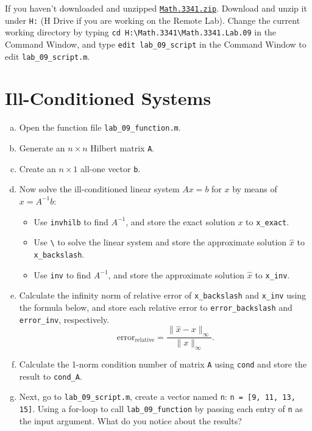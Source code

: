 If you haven't downloaded and unzipped \href{https://libaoj.in/courses/2021f/MATH3341/zip/Math.3341.zip}{\texttt{Math.3341.zip}}. Download and unzip it under \verb|H:| (H Drive if you are working on the Remote Lab). Change the current working directory by typing \verb|cd H:\Math.3341\Math.3341.Lab.09| in the Command Window, and type \verb|edit lab_09_script| in the Command Window to edit \verb|lab_09_script.m|.

\section{Ill-Conditioned Systems}
\begin{enumerate}[(a)]
    \item Open the function file \verb|lab_09_function.m|.
    \item Generate an $n \times n$ Hilbert matrix \verb`A`.
    \item Create an $n \times 1$ all-one vector \verb`b`.
    \item Now solve the ill-conditioned linear system $A x = b$ for $x$ by means of $x = A^{-1} b$:
        \begin{itemize}
            \item Use \verb|invhilb| to find $A^{-1}$, and store the exact solution $x$ to \verb|x_exact|.
            \item Use \verb|\| to solve the linear system and store the approximate solution $\hat{x}$ to \verb|x_backslash|.
            \item Use \verb|inv| to find $A^{-1}$, and store the approximate solution $\hat{x}$ to \verb|x_inv|.
        \end{itemize}
    \item Calculate the infinity norm of relative error of \verb|x_backslash| and \verb|x_inv| using the formula below, and store each relative error to \verb|error_backslash| and \verb|error_inv|, respectively.
        $$
        \mathrm{error}_{\mathrm{relative}} = \frac{\|\hat{x} - x\|_{\infty}}{\|x\|_{\infty}}.
        $$
    \item Calculate the 1-norm condition number of matrix \verb`A` using \verb|cond| and store the result to \verb`cond_A`.
    \item Next, go to \verb|lab_09_script.m|, create a vector named \verb|n|: \verb|n = [9, 11, 13, 15]|. Using a for-loop to call \verb|lab_09_function| by passing each entry of \verb|n| as the input argument. What do you notice about the results?
\end{enumerate}
